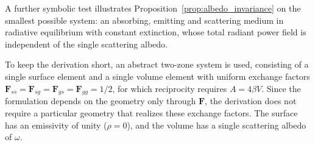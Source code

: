 \documentclass[preprint,1p,times]{elsarticle}
\theoremstyle{plain}
\theoremstyle{definition}
\theoremstyle{remark}
\begin{document}
A further symbolic test illustrates Proposition~\ref{prop:albedo_invariance} on the smallest possible system: an absorbing, emitting and scattering medium in radiative equilibrium with constant extinction, whose total radiant power field is independent of the single scattering albedo.

To keep the derivation short, an abstract two-zone system is used, consisting of a single surface element and a single volume element with uniform exchange factors $\mathbf{F}_{ss} = \mathbf{F}_{sg} = \mathbf{F}_{gs} = \mathbf{F}_{gg} = 1/2$, for which reciprocity requires $A=4\beta V$. Since the formulation depends on the geometry only through $\mathbf{F}$, the derivation does not require a particular geometry that realizes these exchange factors. The surface has an emissivity of unity ($\rho=0$), and the volume has a single scattering albedo of $\omega$.
\end{document}
